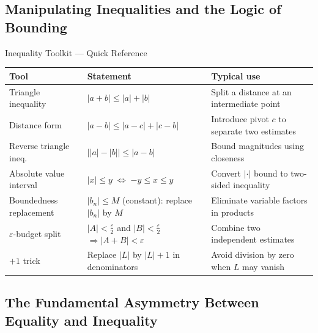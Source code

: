 
\subsection{Manipulating Inequalities and the Logic of Bounding}
\label{sec:inequality-bounding}

\begin{toolkitbox}{Inequality Toolkit --- Quick Reference}
\small
\begin{tabular}{l l l}
\toprule
\textbf{Tool} & \textbf{Statement} & \textbf{Typical use} \\
\midrule
Triangle inequality
  & $|a+b|\leq|a|+|b|$
  & Split a distance at an intermediate point \\[3pt]
Distance form
  & $|a-b|\leq|a-c|+|c-b|$
  & Introduce pivot $c$ to separate two estimates \\[3pt]
Reverse triangle ineq.
  & $\bigl\lvert|a|-|b|\bigr\rvert\leq|a-b|$
  & Bound magnitudes using closeness \\[3pt]
Absolute value interval
  & $|x|\leq y\;\Longleftrightarrow\;{-y}\leq x\leq y$
  & Convert $|\cdot|$ bound to two-sided inequality \\[3pt]
Boundedness replacement
  & $|b_n|\leq M$ (constant): replace $|b_n|$ by $M$
  & Eliminate variable factors in products \\[3pt]
$\varepsilon$-budget split
  & $|A|<\tfrac{\varepsilon}{2}$ and $|B|<\tfrac{\varepsilon}{2}$
    $\Rightarrow|A+B|<\varepsilon$
  & Combine two independent estimates \\[3pt]
$+1$ trick
  & Replace $|L|$ by $|L|+1$ in denominators
  & Avoid division by zero when $L$ may vanish \\
\bottomrule
\end{tabular}
\end{toolkitbox}

\subsection*{The Fundamental Asymmetry Between Equality and Inequality}
\label{subsec:ineq-asymmetry}

